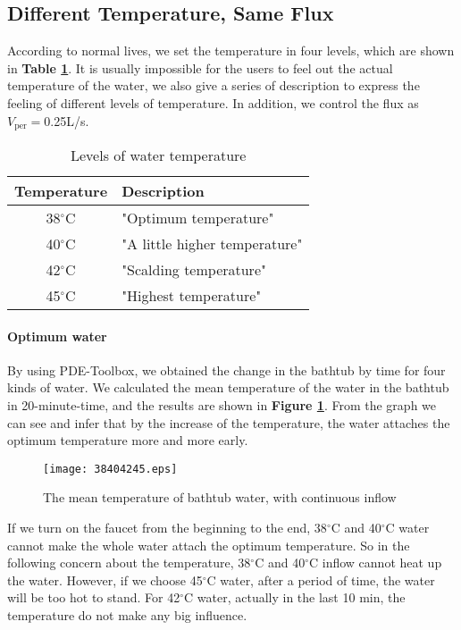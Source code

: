 \documentclass{HZNUMCM}
\begin{document}
\subsection{Different Temperature, Same Flux}
According to normal lives, we set the temperature in four levels, which are shown in \textbf{Table
\ref{show}}. It is usually impossible for the users to feel out the actual temperature of the water,
we also give a series of description to express the feeling of different levels of temperature. In
addition, we control the flux as $V_\mathrm{per}=$0.25L/s.
\begin{table}[!htbp]
\begin{center}
\caption{Levels of water temperature}
\begin{tabular}{cl}
    \toprule
    Temperature&Description\\
    \midrule
    38$^\circ$C&"Optimum temperature"\\
    40$^\circ$C&"A little higher temperature"\\
    42$^\circ$C&"Scalding temperature"\\
    45$^\circ$C&"Highest temperature"\\
    \bottomrule
\end{tabular}\label{show}
\end{center}
\end{table}

\paragraph{Optimum water}
By using PDE-Toolbox, we obtained the change in the bathtub by time for four kinds of water. We
calculated the mean temperature of the water in the bathtub in 20-minute-time, and the results are
shown in \textbf{Figure \ref{34}}. From the graph we can see and infer that by the increase of the
temperature, the water attaches the optimum temperature more and more early.
\begin{figure}[!htbp]
\small
\centering
\texttt{[image: 38404245.eps]}
\caption{The mean temperature of bathtub water, with continuous inflow}\label{34}
\end{figure}

If we turn on the faucet from the beginning to the end, 38$^\circ$C and 40$^\circ$C water cannot
make the whole water attach the optimum temperature. So in the following concern about the
temperature, 38$^\circ$C and 40$^\circ$C inflow cannot heat up the water. However, if we choose
45$^\circ$C water, after a period of time, the water will be too hot to stand. For 42$^\circ$C
water, actually in the last 10 min, the temperature do not make any big influence.
\end{document}
